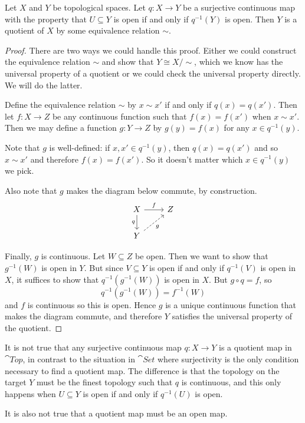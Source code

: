 \documentclass[noname]{notes}
\begin{document}
\begin{proposition}
	Let $X$ and $Y$ be topological spaces. Let $q \colon X \to Y$ be a surjective continuous map with the property that $U \subseteq Y$ is open if and only if $q^{-1}(Y)$ is open. Then $Y$ is a quotient of $X$ by some equivalence relation $\sim$. 
\end{proposition}

\begin{proof}
	There are two ways we could handle this proof. Either we could construct the equivalence relation $\sim$ and show that $Y \cong X/\!\!\sim$, which we know has the universal property of a quotient or we could check the universal property directly. We will do the latter. 
	
	Define the equivalence relation $\sim$ by $x \sim x'$ if and only if $q(x) = q(x')$. Then let $f \colon X \to Z$ be any continuous function such that $f(x) = f(x')$ when $x \sim x'$. Then we may define a function $g \colon Y \to Z$ by $g(y) = f(x)$ for any $x \in q^{-1}(y)$. 
	
	Note that $g$ is well-defined: if $x, x' \in q^{-1}(y)$, then $q(x) = q(x')$ and so $x \sim x'$ and therefore $f(x) = f(x')$. So it doesn't matter which $x \in q^{-1}(y)$ we pick. 

	Also note that $g$ makes the diagram below commute, by construction. 
	\[
		\begin{tikzcd}
			X \ar[r, "f"] \ar[d, "q"'] & Z \\
			Y \ar[ur, dashed, "g"'] 
		\end{tikzcd}
	\]
	
	Finally, $g$ is continuous. Let $W \subseteq Z$ be open. Then we want to show that $g^{-1}(W)$ is open in $Y$. But since $V \subseteq Y$ is open if and only if $q^{-1}(V)$ is open in $X$, it suffices to show that $q^{-1}(g^{-1}(W))$ is open in $X$. But $g \circ q = f$, so 
	\[
		q^{-1}(g^{-1}(W)) = f^{-1}(W)
	\]
	and $f$ is continuous so this is open. Hence $g$ is a unique continuous function that makes the diagram commute, and therefore $Y$ satisfies the universal property of the quotient. 
\end{proof}

\begin{remark}
	It is not true that any surjective continuous map $q \colon X \to Y$ is a quotient map in $\cat{Top}$, in contrast to the situation in $\cat{Set}$ where surjectivity is the only condition necessary to find a quotient map. The difference is that the topology on the target $Y$ must be the finest topology such that $q$ is continuous, and this only happens when $U \subseteq Y$ is open if and only if $q^{-1}(U)$ is open. 
	
	It is also not true that a quotient map must be an open map. 
\end{remark}
\end{document}
